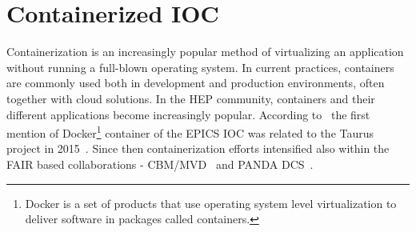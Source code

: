 \section{Containerized IOC}
\label{containerizer_ioc}
Containerization is an increasingly popular method of virtualizing an application without running a full-blown operating system. In current practices, containers are commonly used both in development and production environments, often together with cloud solutions. In the \gls{HEP} community, containers and their different applications become increasingly popular. According to~\cite{Klaus2021} the first mention of Docker\footnote{Docker is a set of products that use operating system level virtualization to deliver software in packages called containers.} container of the \gls{EPICS} \gls{IOC} was related to the Taurus project in 2015~\cite{taurus}. Since then containerization efforts intensified also within the \gls{FAIR} based collaborations - \gls{CBM}/\gls{MVD}~\cite{Klaus2021} and PANDA DCS~\cite{PANDA_1}.

